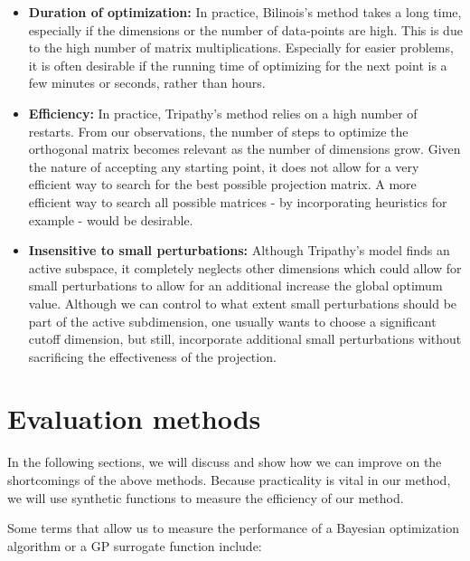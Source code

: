 \begin{itemize}

\item \textbf{Duration of optimization:} In practice, Bilinois's method takes a long time, especially if the dimensions or the number of data-points are high. This is due to the high number of matrix multiplications. 
Especially for easier problems, it is often desirable if the running time of optimizing for the next point is a few minutes or seconds, rather than hours.

\item \textbf{Efficiency:} In practice, Tripathy's method relies on a high number of restarts.
From our observations, the number of steps to optimize the orthogonal matrix becomes relevant as the number of dimensions grow.
Given the nature of accepting any starting point, it does not allow for a very efficient way to search for the best possible projection matrix.
A more efficient way to search all possible matrices - by incorporating heuristics for example - would be desirable.

\item \textbf{Insensitive to small perturbations:} Although Tripathy's model finds an active subspace, it completely neglects other dimensions which could allow for small perturbations to allow for an additional increase the global optimum value.
Although we can control to what extent small perturbations should be part of the active subdimension, one usually wants to choose a significant cutoff dimension, but still, incorporate additional small perturbations without sacrificing the effectiveness of the projection.

\end{itemize}

\section{Evaluation methods}
In the following sections, we will discuss and show how we can improve on the shortcomings of the above methods.
Because practicality is vital in our method, we will use synthetic functions to measure the efficiency of our method.

Some terms that allow us to measure the performance of a Bayesian optimization algorithm or a GP surrogate function include:

